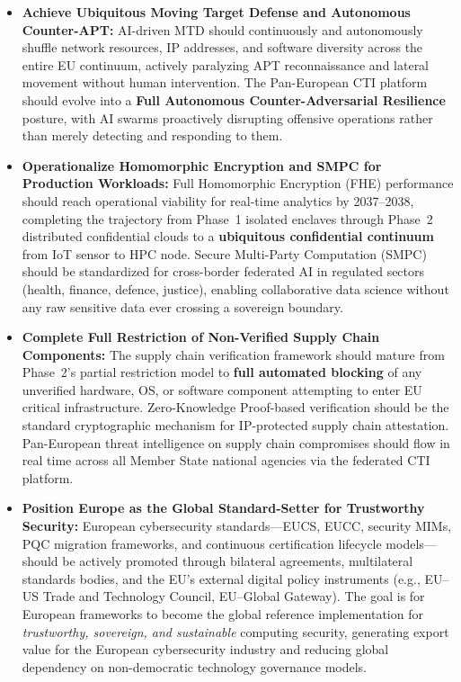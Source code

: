 \documentclass{ieeeaccess}
\begin{document}
\begin{itemize}
    \item \textbf{Achieve Ubiquitous Moving Target Defense and Autonomous Counter-APT:}
    AI-driven MTD should continuously and autonomously shuffle network resources, IP
    addresses, and software diversity across the entire EU continuum, actively paralyzing
    APT reconnaissance and lateral movement without human intervention. The Pan-European
    CTI platform should evolve into a \textbf{Full Autonomous Counter-Adversarial Resilience}
    posture, with AI swarms proactively disrupting offensive operations rather than merely
    detecting and responding to them.

    \item \textbf{Operationalize Homomorphic Encryption and SMPC for Production Workloads:}
    Full Homomorphic Encryption (FHE) performance should reach operational viability for
    real-time analytics by 2037--2038, completing the trajectory from Phase~1 isolated
    enclaves through Phase~2 distributed confidential clouds to a \textbf{ubiquitous
    confidential continuum} from IoT sensor to HPC node. Secure Multi-Party Computation
    (SMPC) should be standardized for cross-border federated AI in regulated sectors
    (health, finance, defence, justice), enabling collaborative data science without any
    raw sensitive data ever crossing a sovereign boundary.

    \item \textbf{Complete Full Restriction of Non-Verified Supply Chain Components:}
    The supply chain verification framework should mature from Phase~2's partial restriction
    model to \textbf{full automated blocking} of any unverified hardware, OS, or software
    component attempting to enter EU critical infrastructure. Zero-Knowledge Proof-based
    verification should be the standard cryptographic mechanism for IP-protected supply
    chain attestation. Pan-European threat intelligence on supply chain compromises should
    flow in real time across all Member State national agencies via the federated CTI
    platform.

    \item \textbf{Position Europe as the Global Standard-Setter for Trustworthy Security:}
    European cybersecurity standards---EUCS, EUCC, security MIMs, PQC migration frameworks,
    and continuous certification lifecycle models---should be actively promoted through
    bilateral agreements, multilateral standards bodies, and the EU's external digital
    policy instruments (e.g., EU--US Trade and Technology Council, EU--Global Gateway). The
    goal is for European frameworks to become the global reference implementation for
    \emph{trustworthy, sovereign, and sustainable} computing security, generating export
    value for the European cybersecurity industry and reducing global dependency on
    non-democratic technology governance models.
\end{itemize}
\end{document}
